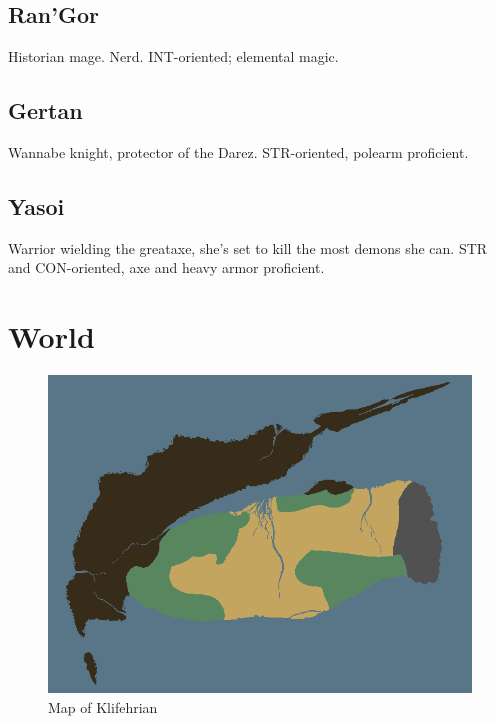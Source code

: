 \documentclass[a4paper,12pt]{book}
\begin{document}
\section{Ran'Gor}
Historian mage. Nerd. INT-oriented; elemental magic.
\section{Gertan}
Wannabe knight, protector of the Darez. STR-oriented, polearm proficient.
\section{Yasoi}
Warrior wielding the greataxe, she's set to kill the most demons she can. STR and CON-oriented, axe and heavy armor proficient.
\chapter{World}
\begin{figure}[h]
	\centering
		\includegraphics[scale=2]{worldmap.png}
	\caption{Map of Klifehrian}
	\label{fig:worldmap}
\end{figure}
\end{document}
